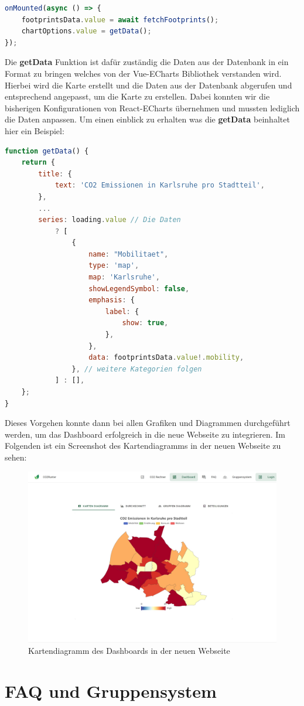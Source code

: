 \begin{lstlisting}[language={JavaScript}, caption={Laden der Fußabdrücke und erstellen der Diagramm Daten und Konfiguration}]
onMounted(async () => {
    footprintsData.value = await fetchFootprints();
    chartOptions.value = getData();
});
\end{lstlisting}

Die \textbf{getData} Funktion ist dafür zuständig die Daten aus der Datenbank in ein Format zu bringen welches von der Vue-ECharts Bibliothek verstanden wird. Hierbei wird die Karte erstellt und die Daten aus der Datenbank abgerufen und entsprechend angepasst, um die Karte zu erstellen. Dabei konnten wir die bisherigen Konfigurationen von React-ECharts übernehmen und mussten lediglich die Daten anpassen. Um einen einblick zu erhalten was die \textbf{getData} beinhaltet hier ein Beispiel:

\begin{lstlisting}[language={JavaScript}, caption={Beispiel Konfiguration für ECharts Diagramme}]
function getData() {
    return {
        title: {
            text: 'CO2 Emissionen in Karlsruhe pro Stadtteil',
        },
        ...
        series: loading.value // Die Daten
            ? [
                {
                    name: "Mobilitaet",
                    type: 'map',
                    map: 'Karlsruhe',
                    showLegendSymbol: false,
                    emphasis: {
                        label: {
                            show: true,
                        },
                    },
                    data: footprintsData.value!.mobility,
                }, // weitere Kategorien folgen
            ] : [],
    };
}
\end{lstlisting}

Dieses Vorgehen konnte dann bei allen Grafiken und Diagrammen durchgeführt werden, um das Dashboard erfolgreich in die neue Webseite zu integrieren. Im Folgenden ist ein Screenshot des Kartendiagramms in der neuen Webseite zu sehen:

\begin{figure}[H]
    \centering
    \includegraphics[width=1\textwidth]{images/06/Dashboard-Design.jpeg}
    \caption{Kartendiagramm des Dashboards in der neuen Webseite}
    \label{fig:new-co2runter-dashboard-design}
\end{figure}

\section{FAQ und Gruppensystem}

